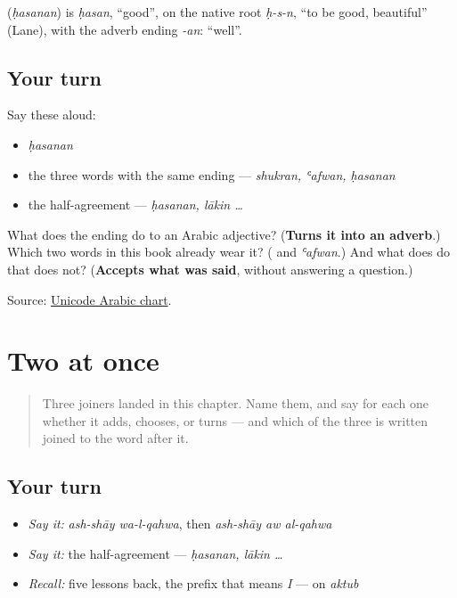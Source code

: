 \begin{cousinweb}
\textbf{} (\emph{ḥasanan}) is \emph{ḥasan}, \textquotedblleft{}good\textquotedblright{}, on the native root \emph{ḥ-s-n}, \textquotedblleft{}to be good, beautiful\textquotedblright{} (Lane), with the adverb ending \emph{-an}: \textquotedblleft{}well\textquotedblright{}.
\end{cousinweb}

\subsection*{Your turn}
Say these aloud:

\begin{itemize}
\raggedright
  \item \emph{ḥasanan}
  \item the three words with the same ending — \emph{shukran, ʿafwan, ḥasanan}
  \item the half-agreement — \emph{ḥasanan, lākin …}
\end{itemize}

\begin{tcolorbox}[breakable,colback=teal!4,colframe=teal!35!black,title={Before you move on}]
What does the \textbf{} ending do to an Arabic adjective? (\textbf{Turns it into an adverb}.) Which two words in this book already wear it? (\textbf{} and \emph{ʿafwan}.) And what does \textbf{} do that \textbf{} does not? (\textbf{Accepts what was said}, without answering a question.)

Source: \href{https://www.unicode.org/charts/PDF/U0600.pdf}{Unicode Arabic chart}.
\end{tcolorbox}
\section[\texorpdfstring{\ar{و} · \ar{أو} · \ar{لكن} (wa- · aw · lākin)}{و · أو · لكن (wa- · aw · lākin)}]{Two at once}

\label{lesson:AR-R38-two-at-once}



\begin{quote}
Three joiners landed in this chapter. Name them, and say for each one whether it adds, chooses, or turns — and which of the three is written joined to the word after it.
\end{quote}

\subsection*{Your turn}
\begin{itemize}
\raggedright
  \item \emph{Say it:} \emph{ash-shāy wa-l-qahwa}, then \emph{ash-shāy aw al-qahwa}
  \item \emph{Say it:} the half-agreement — \emph{ḥasanan, lākin …}
  \item \emph{Recall:} five lessons back, the prefix that means \emph{I} — on \emph{aktub}
\end{itemize}

